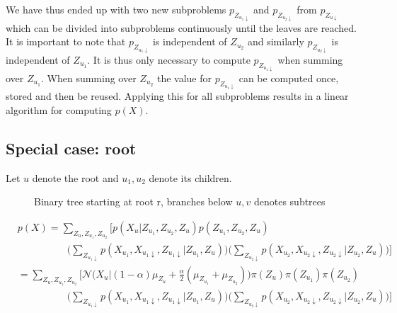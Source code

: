 We have thus ended up with two new subproblems $p_{Z_{u_1\downarrow}}$ and $p_{Z_{u_2\downarrow}}$ from $p_{Z_{u \downarrow}}$ which can be divided into subproblems continuously until the leaves are reached.
\\

It is important to note that $p_{Z_{u_1\downarrow}}$ is independent of $Z_{u_2}$ and similarly $p_{Z_{u_2\downarrow}}$ is independent of $Z_{u_1}$. It is thus only necessary to compute $p_{Z_{u_1\downarrow}}$ when summing over $Z_{u_1}$. When summing over $Z_{u_2}$ the value for $p_{Z_{u_1\downarrow}}$ can be computed once, stored and then be reused. Applying this for all subproblems results in a linear algorithm for computing $p(X)$.

\subsection*{Special case: root}

Let $u$ denote the root and $u_1, u_2$ denote its children.
\begin{figure}[H]
\begin{center}
\end{center}
\caption{Binary tree starting at root r, branches below $u, v$ denotes subtrees}
\end{figure}

\begin{align}
  & p(X) = \sum_{Z_u, Z_{u_1}, Z_{u_2}}\bigg[p(X_u|Z_{u_1}, Z_{u_2}, Z_u) p(Z_{u_1}, Z_{u_2}, Z_u) \nonumber\\
  & \qquad\qquad\quad \Big(\sum_{Z_{u_1 \downarrow}} p(X_{u_1}, X_{u_1 \downarrow}, Z_{u_1 \downarrow}|Z_{u_1}, Z_u) \Big)\Big(\sum_{Z_{u_2 \downarrow}} p(X_{u_2}, X_{u_2 \downarrow}, Z_{u_2 \downarrow}|Z_{u_2}, Z_u) \Big)\bigg] \nonumber \\
  & = \sum_{Z_u, Z_{u_1}, Z_{u_2}}\bigg[\mathcal{N}\Big(X_u|(1-\alpha)\mu_{Z_u} +\frac{\alpha}{2}(\mu_{Z_{u_1}}+\mu_{Z_{u_2}}) \Big) \pi(Z_u) \pi(Z_{u_1}) \pi(Z_{u_2})\\
  & \qquad\qquad\quad \Big(\sum_{Z_{u_1 \downarrow}} p(X_{u_1}, X_{u_1 \downarrow}, Z_{u_1 \downarrow}|Z_{u_1}, Z_u) \Big)\Big(\sum_{Z_{u_2 \downarrow}} p(X_{u_2}, X_{u_2 \downarrow}, Z_{u_2 \downarrow}|Z_{u_2}, Z_u) \Big)\bigg]
\end{align}



